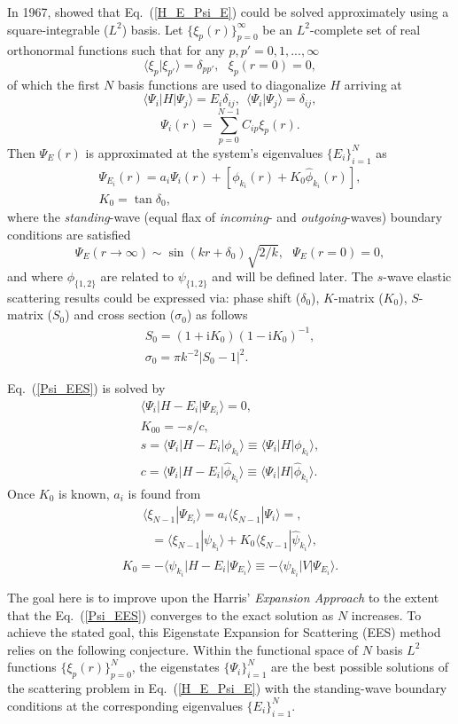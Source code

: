 \documentclass[aip
, pra
, showpacs
, aps
, twocolumn
, groupedaddress
, floatfix
]{revtex4}
\newcommand{\beq}{\begin{equation}}
\newcommand{\eeq}{\end{equation}}
\newcommand{\barr}{\begin{array}}
\newcommand{\earr}{\end{array}}
\begin{document}
In 1967, \citet{Harris67} showed that Eq.~(\ref{H_E_Psi_E}) could be solved
approximately using a square-integrable ($L^2$) basis.
Let $\{\xi_p(r)\}_{p=0}^\infty$ be an $L^2$-complete set of real orthonormal functions
such that for any $p,p'=0,1,...,\infty$
\beq
\langle \xi_p | \xi_{p'} \rangle=\delta_{pp'}, \ \ \ \xi_p(r=0)=0,
\eeq
of which the first $N$ basis functions are used to diagonalize $H$ arriving at
\beq
\langle \Psi_i |H| \Psi_j \rangle = E_i \delta_{ij} , \ \ \langle \Psi_i | \Psi_j \rangle=\delta_{ij},
\eeq
\beq
\Psi_i(r) = \sum_{p=0}^{N-1} C_{ip} \xi_p(r).
\eeq
Then $\Psi_E(r)$ is approximated at the system's eigenvalues $\{E_i\}_{i=1}^{N}$ as
\cite{Harris67}
\beq \barr{l}
\Psi_{E_i}(r) = a_i \Psi_i(r)  + [\phi_{k_i}(r)  + K_0 \widehat{\phi}_{k_i}(r)],\\
K_0 = \tan{\delta_0},
\earr \label{Psi_EES} \eeq
where the {\em standing}-wave (equal flax of {\em incoming}- and {\em outgoing}-waves) boundary conditions are satisfied
\beq
\Psi_E(r \rightarrow \infty) \sim  \sin(kr+\delta_0) \sqrt{2/k}, \ \ \ \Psi_E(r= 0)=0,
\eeq
and where $\phi_{\{1,2\}}$ are related to $\psi_{\{1,2\}}$ and will be defined later.
The $s$-wave elastic scattering results could be expressed via:
phase shift ($\delta_0$), $K$-matrix ($K_0$), $S$-matrix ($S_{0}$) and cross section ($\sigma_{0}$)
as follows
\beq \barr{l}
S_{0}=(1+\mbox{i}K_0)(1-\mbox{i}K_0)^{-1}, \\
\sigma_{0}=\pi k^{-2} |S_{0}-1|^2.
\earr \eeq


Eq.~(\ref{Psi_EES}) is solved by
\beq \barr{l}
\langle\Psi_i|H-E_i|\Psi_{E_i}\rangle=0,\\
K_{00} = - s / c, \\
s = \langle\Psi_i|H-E_i|  \phi_{k_i} \rangle \equiv \langle\Psi_i|H|  \phi_{k_i} \rangle, \\
c = \langle\Psi_i|H-E_i|  \widehat{\phi}_{k_i} \rangle \equiv \langle\Psi_i|H|  \widehat{\phi}_{k_i} \rangle.
\earr \eeq
Once $K_0$ is known, $a_i$ is found from
\beq \barr{l}
\langle \xi_{N-1} | \Psi_{E_i}\rangle
= a_i \langle \xi_{N-1}| \Psi_i \rangle = ,\\
\ \ \ =  \langle \xi_{N-1}| \psi_{k_i} \rangle
+ K_0 \langle \xi_{N-1}| \widehat{\psi}_{k_i} \rangle ,\\
\earr \eeq
\beq
K_0 = -\langle \psi_{k_i} | H - E_i | \Psi_{E_i} \rangle \equiv
-\langle \psi_{k_i} | V | \Psi_{E_i} \rangle.
\eeq


The goal here is to improve upon the Harris' {\em Expansion Approach} \cite{Harris67} to the extent that the Eq.~(\ref{Psi_EES})
converges to the exact solution as $N$ increases.
To achieve the stated goal, this Eigenstate Expansion for Scattering (EES) method relies on the following conjecture.
Within the functional space of $N$ basis $L^2$ functions  $\{\xi_p(r)\}_{p=0}^N$,
the eigenstates $\{\Psi_i\}_{i=1}^{N}$ are the best possible solutions of the scattering problem in Eq.~(\ref{H_E_Psi_E})
with the standing-wave boundary conditions at the corresponding eigenvalues $\{E_i\}_{i=1}^{N}$.
\end{document}
